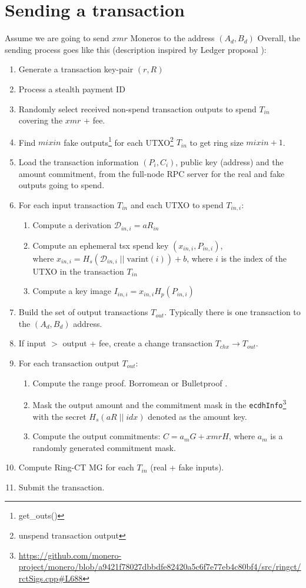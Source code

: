 \documentclass[]{article}
\begin{document}
\section{Sending a transaction}
Assume we are going to send $xmr$ Moneros to the address $(A_d, B_d)$
Overall, the sending process goes like this (description inspired by Ledger proposal \cite{ledger_doc}):

\begin{enumerate}
	\item Generate a transaction key-pair $(r, R)$
	\item Process a stealth payment ID
	\item Randomly select received non-spend transaction outputs to spend $T_{in}$ covering the $xmr$ + fee.
	\item Find $mixin$ fake outputs\footnote{get\_outs()} for each UTXO\footnote{unspend transaction output} $T_{in}$ to get ring size $mixin + 1$.
	\item Load the transaction information $(P_i, C_i)$, public key (address) and the amount commitment, from the full-node RPC server for the real and fake outputs going to spend.
	\item For each input transaction $T_{in}$ and each UTXO to spend $T_{in,i}$:
	\begin{enumerate}
		\item Compute a derivation $\mathcal{D}_{in,i} = aR_{in}$
		\item Compute an ephemeral tsx spend key $(x_{in,i}, P_{in,i})$, \\where $x_{in,i} = H_s(\mathcal{D}_{in,i} \; || \; \text{varint}(i)) + b$, where $i$ is the index of the UTXO in the transaction $T_{in}$
		\item Compute a key image $I_{in,i} = x_{in,i}H_p(P_{in,i})$
	\end{enumerate}
	\item Build the set of output transactions $T_{out}$. Typically there is one transaction to the $(A_d, B_d)$ address.
	\item If input $>$ output + fee, create a change transaction $T_{chx} \rightarrow T_{out}$. 
	\item For each transaction output $T_{out}$:
	\begin{enumerate}
		\item Compute the range proof. Borromean or Bulletproof \cite{monero_1098, borromean, Bnz2017BulletproofsSP}.
		\item Mask the output amount and the commitment mask in the \verb|ecdhInfo|\footnote{\url{https://github.com/monero-project/monero/blob/a9421f78027dbbdfe82420a5c6f7e77eb4c80bf4/src/ringct/rctSigs.cpp\#L688}} with the secret $H_s(aR\; || \; idx)$ denoted as the amount key.
		\item Compute the output commitments: $C = a_mG + xmrH$, where $a_m$ is a randomly generated commitment mask.
	\end{enumerate}
	\item Compute Ring-CT MG for each $T_{in}$ (real + fake inputs).
	\item Submit the transaction.
\end{enumerate}
\end{document}
